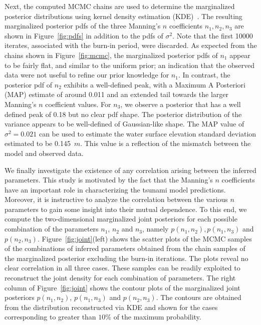 Next, the computed MCMC chains are used to determine the marginalized posterior 
distributions using kernel density estimation (KDE)~\citep{Parzen1962,Silverman1986}.  
The resulting marginalized posterior pdfs of the three Manning's $n$ coefficients 
$n_1,n_2,n_3$ are shown in Figure~\ref{fig:pdfs} in addition to the pdfs of $\sigma^2$. 
Note that the first 10000 iterates, associated with the burn-in period, were discarded.  
As expected from the chains shown in Figure~\ref{fig:mcmc}, the marginalized posterior 
pdfs of $n_1$ appear to be fairly flat, and similar to the uniform prior; an indication 
that the observed data were not useful to refine our prior knowledge for $n_1$. In 
contrast, the posterior pdf of $n_2$ exhibits a well-defined peak, with a Maximum A 
Posteriori (MAP) estimate of around 0.011 and an extended tail towards the larger 
Manning's $n$ coefficient values. For $n_3$, we observe a posterior that has a well 
defined peak of 0.18 but no clear pdf shape. The posterior distribution of the variance 
appears to be well-defined of Gaussian-like shape. The MAP value of $\sigma^2=0.021$ 
can be used to estimate the water surface elevation standard deviation estimated to 
be 0.145~$m$. This value is a reflection of the mismatch between the model and 
observed data.

We finally investigate the existence of any correlation arising between the inferred parameters.
This study is motivated by the fact that the Manning's $n$ coefficients have an important role 
in characterizing the tsunami model predictions. Moreover, it is instructive to analyze the 
correlation between the various $n$ parameters to gain some insight into their mutual dependence.
To this end, we compute the two-dimensional marginalized joint posteriors for each 
possible combination of the parameters $n_1$, $n_2$ and $n_3$, namely $p(n_1, n_2), p(n_1, n_3)$ and $p(n_2, n_3)$. 
Figure~\ref{fig:joint}(left) shows the scatter plots of the MCMC samples of the combinations of 
inferred parameters obtained from the chain samples of the marginalized posterior excluding 
the burn-in iterations. The plots reveal no clear correlation in all three cases. 
These samples can be readily exploited to reconstruct the joint density for each combination of parameters. 
The right column of Figure~\ref{fig:joint} shows the contour plots of the marginalized joint posteriors 
$p(n_1, n_2)$, $p(n_1, n_3)$ and $p(n_2, n_3)$. The contours are obtained from the
distribution reconstructed via KDE and shown for the cases corresponding to greater than $10\%$
of the maximum probability.

